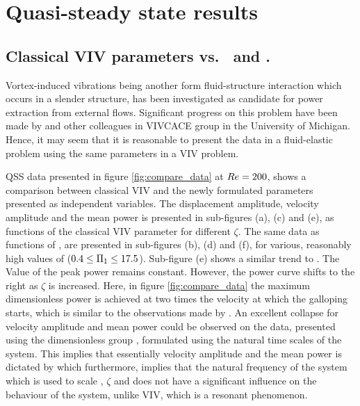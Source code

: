 \section{Quasi-steady state results}
\label{sec:qss_results} 

\subsection{Classical VIV parameters vs. \massstiff \ and \massdamp.}
\label{subsec:compare_data}


Vortex-induced vibrations being another form fluid-structure interaction which occurs in a slender structure, has been investigated as candidate for power extraction from external flows. Significant progress on this problem have been made by \cite{Bernitsas2008a-concept,Bernitsas2009,Raghavan2010a,Lee2011b} and other colleagues in VIVCACE group in the University of Michigan. Hence, it may seem that it is reasonable to present the data in a fluid-elastic problem using the same parameters in a VIV problem.



QSS data presented in figure \ref{fig:compare_data} at $Re=200$, shows a comparison between classical VIV and the newly formulated parameters presented as independent variables. The displacement amplitude, velocity amplitude and the mean power is presented in sub-figures (a), (c) and (e), as functions of the classical VIV parameter \ustar for different $\zeta$. The same data as functions of \massdamp, are presented in sub-figures (b), (d) and (f), for various, reasonably high values of \massstiff ($0.4\leq\Pi_1\leq17.5$). Sub-figure (e) shows a similar trend to \cite{Barrero-Gil2010a}. The Value of the peak power remains constant. However, the power curve shifts to the right as $\zeta$ is increased. Here, in figure \ref{fig:compare_data} the maximum dimensionless power is achieved at two times the velocity at which the galloping starts, which is similar to the observations made by \citet{Barrero-Gil2010a,vicente-Ludlam2014}. An excellent collapse for velocity amplitude and mean power could be observed on the data, presented using the dimensionless group \massdamp, formulated using the natural time scales of the system. This implies that essentially velocity amplitude and the mean power is dictated by \massdamp which furthermore, implies that the natural frequency of the system which is used to scale \ustar, $\zeta$ and \massstiff does not have a significant influence on the behaviour of the system, unlike VIV, which is a resonant phenomenon.  
 


